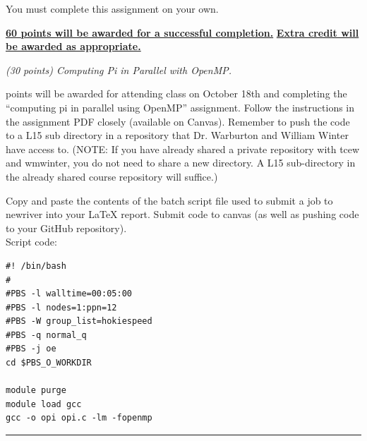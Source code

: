 \documentclass{article}
\newcommand{\myhrule}{ \begin{center}\rule{.9\linewidth}{.25mm}\end{center} }
\newcommand{\pad}{\vspace{8pt}\noindent}
\begin{document}
\pad You must complete this assignment on your own. 

\vspace{16pt}
\begin{center}
\underline{\bf 60 points will be awarded for a successful completion.}
\vspace{8pt}\underline{\bf Extra credit will be awarded as appropriate.}
\end{center}

\newpage




\pad {\bf Q1} {\it (30 points) Computing Pi in Parallel with OpenMP.}
\vspace{8pt} 

 points will be awarded for attending class on October 18th and completing the ``computing pi in parallel using OpenMP'' assignment. Follow the instructions in the assignment PDF closely (available on Canvas). Remember to push the code to a L15 sub directory in a repository that Dr. Warburton and William Winter have access to. (NOTE: If you have already shared a private repository with tcew and wmwinter, you do not need to share a new directory. A L15 sub-directory in the already shared course repository will suffice.) 

\vspace{1em}


\noindent Copy and paste the contents of the batch script file used to submit a job to newriver into your \LaTeX{} report. Submit code to canvas (as well as pushing code to your GitHub repository). \\

Script code:

\begin{verbatim}
#! /bin/bash                                                                    
#                                                                               
#PBS -l walltime=00:05:00                                                       
#PBS -l nodes=1:ppn=12                                                          
#PBS -W group_list=hokiespeed                                                   
#PBS -q normal_q                                                                
#PBS -j oe                                                                      
cd $PBS_O_WORKDIR

module purge
module load gcc
gcc -o opi opi.c -lm -fopenmp
\end{verbatim}

\myhrule
\end{document}
